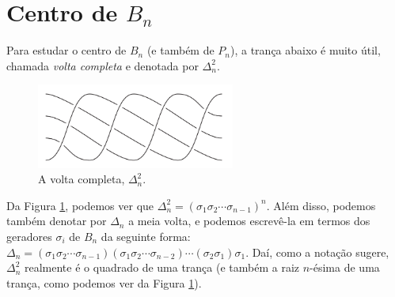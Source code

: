 	\section{Centro de \texorpdfstring{$B_n$}{Bn}}\label{secao centro de B_n}
	Para estudar o centro de $B_n$ (e também de $P_n$), a trança abaixo é muito útil, chamada 
	\textit{volta completa} e denotada por $\Delta_n^2$. 
	\begin{figure}[H]
		\begin{center}
			\includegraphics[width=6.5cm]{Images/volta_completa.png}
		\end{center}\caption{A volta completa, $\Delta_n^2$.}
		\label{full twist}
	\end{figure}
	Da Figura \ref{full twist}, podemos ver que $\Delta_n^2 = (\sigma_1\sigma_2\cdots\sigma_{n-1})^n$. 
	Além disso, podemos também denotar por $\Delta_n$ a meia volta, e podemos escrevê-la em termos 
	dos geradores $\sigma_i$ de $B_n$ da seguinte forma: 
	$\Delta_n 
	= (\sigma_1\sigma_2\cdots\sigma_{n-1})
	(\sigma_1\sigma_2\cdots\sigma_{n-2})
	\cdots(\sigma_2\sigma_1)\sigma_1$. Daí, como a notação sugere, $\Delta_n^2$ realmente é o quadrado 
	de uma trança (e também a raiz $n$-ésima de uma trança, como podemos ver da Figura \ref{full twist}).
	
